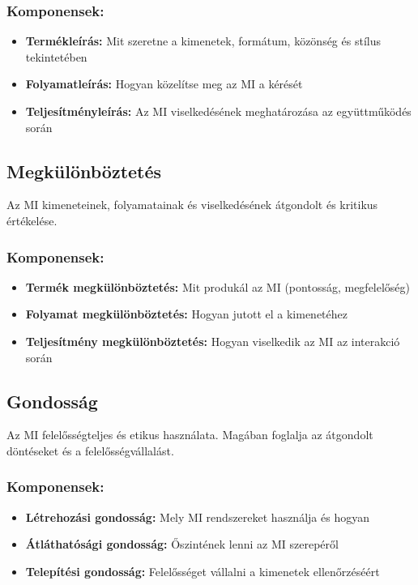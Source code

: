 \documentclass[a4paper, 11pt]{article}
\begin{document}
\begin{multicols}{2}
\subsubsection{Komponensek:}
\begin{itemize}
\item \textbf{Termékleírás:} Mit szeretne a kimenetek, formátum, közönség és stílus tekintetében
\item \textbf{Folyamatleírás:} Hogyan közelítse meg az MI a kérését
\item \textbf{Teljesítményleírás:} Az MI viselkedésének meghatározása az együttműködés során
\end{itemize}

\subsection{Megkülönböztetés}
Az MI kimeneteinek, folyamatainak és viselkedésének átgondolt és kritikus értékelése.

\subsubsection{Komponensek:}
\begin{itemize}
\item \textbf{Termék megkülönböztetés:} Mit produkál az MI (pontosság, megfelelőség)
\item \textbf{Folyamat megkülönböztetés:} Hogyan jutott el a kimenetéhez
\item \textbf{Teljesítmény megkülönböztetés:} Hogyan viselkedik az MI az interakció során
\end{itemize}

\subsection{Gondosság}
Az MI felelősségteljes és etikus használata. Magában foglalja az átgondolt döntéseket és a felelősségvállalást.

\subsubsection{Komponensek:}
\begin{itemize}
\item \textbf{Létrehozási gondosság:} Mely MI rendszereket használja és hogyan
\item \textbf{Átláthatósági gondosság:} Őszintének lenni az MI szerepéről
\item \textbf{Telepítési gondosság:} Felelősséget vállalni a kimenetek ellenőrzéséért
\end{itemize}


\end{multicols}
\end{document}
